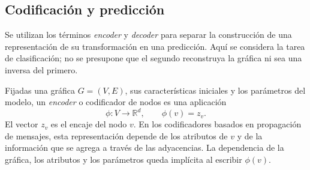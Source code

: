 \begin{figure}[ht]
\end{figure}




\subsection{Codificación y predicción}
Se utilizan los términos \textit{encoder} y \textit{decoder} para separar la construcción de una representación de su transformación en una predicción. Aquí se considera la tarea de clasificación; no se presupone que el segundo reconstruya la gráfica ni sea una inversa del primero.

\begin{definition}[Encoder]
\label{def:encoder}
Fijadas una gráfica $G=(V,E)$, sus características iniciales y los parámetros del modelo, un \emph{encoder} o codificador de nodos es una aplicación
\[
\phi:V\longrightarrow\mathbb R^d,\qquad \phi(v)=z_v.
\]
El vector $z_v$ es el encaje del nodo $v$. En los codificadores basados en propagación de mensajes, esta representación depende de los atributos de $v$ y de la información que se agrega a través de las adyacencias. La dependencia de la gráfica, los atributos y los parámetros queda implícita al escribir $\phi(v)$.
\end{definition}

